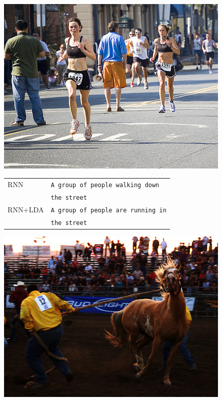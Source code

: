 \begin{figure}
	\centering
	\begin{minipage}[t]{.3\textwidth}
		\centering
		\vspace{0pt}
		\includegraphics[width=\textwidth]{Images/Results/guide/2}
	\end{minipage}\hfill	
	\begin{minipage}[t]{.7\textwidth}
		\vspace{0pt}
		\begin{tabular}{ll}
			RNN & \texttt{A group of people walking down} \\
		     ~ & \texttt{the street} \\
			RNN+LDA& \texttt{A group of people are running in}\\
			~ & \texttt{the street} \\
		\end{tabular}
	\end{minipage}
	\centering
	\begin{minipage}[t]{.3\textwidth}
		\centering
		\vspace{0pt}
		\includegraphics[width=\textwidth]{Images/Results/guide/1}

\end{minipage}
\end{figure}
